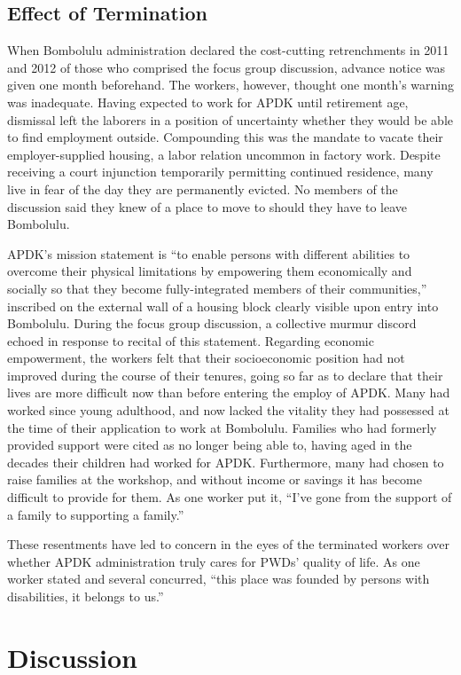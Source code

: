 \documentclass{../../../coursework}
\begin{document}
\subsection{Effect of Termination}

When Bombolulu administration declared the cost-cutting retrenchments in 2011
and 2012 of those who comprised the focus group discussion, advance notice was
given one month beforehand. The workers, however, thought one month's warning
was inadequate. Having expected to work for APDK until retirement age,
dismissal left the laborers in a position of uncertainty whether they would be
able to find employment outside. Compounding this was the mandate to vacate
their employer-supplied housing, a labor relation uncommon in factory work.
Despite receiving a court injunction temporarily permitting continued
residence, many live in fear of the day they are permanently evicted. No
members of the discussion said they knew of a place to move to should they
have to leave Bombolulu.

APDK's mission statement is ``to enable persons with different abilities to
overcome their physical limitations by empowering them economically and
socially so that they become fully-integrated members of their communities,''
inscribed on the external wall of a housing block clearly visible upon entry
into Bombolulu. During the focus group discussion, a collective murmur discord
echoed in response to recital of this statement. Regarding economic
empowerment, the workers felt that their socioeconomic position had not
improved during the course of their tenures, going so far as to declare that
their lives are more difficult now than before entering the employ of APDK.
Many had worked since young adulthood, and now lacked the vitality they had
possessed at the time of their application to work at Bombolulu. Families who
had formerly provided support were cited as no longer being able to, having
aged in the decades their children had worked for APDK. Furthermore, many had
chosen to raise families at the workshop, and without income or savings it has
become difficult to provide for them. As one worker put it, ``I've gone from
the support of a family to supporting a family.''

These resentments have led to concern in the eyes of the terminated workers
over whether APDK administration truly cares for PWDs' quality of life. As one
worker stated and several concurred, ``this place was founded by persons with
disabilities, it belongs to us.''

\section{Discussion}
\end{document}
